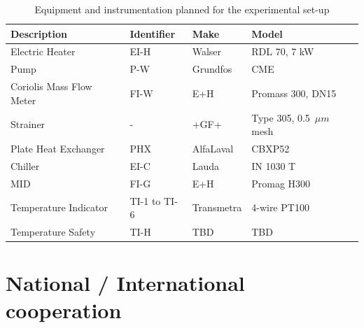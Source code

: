 \documentclass[english]{SFOEYearlyReportEnglish_2018}
\begin{document}
\begin{table}
\centering
\caption{Equipment and instrumentation planned for the experimental set-up}
\setlength\extrarowheight{5pt}
\begin{tabular}{|m{4cm}|m{2cm}|m{2cm}|m{4cm}|}
\hline
\textbf{Description}     & \textbf{Identifier}                      & \textbf{Make}                         & \textbf{Model}                         \\ \hline
Electric Heater          & EI-H                                     & Walser                                & RDL 70, 7 kW                           \\ \hline
Pump                     & P-W                                      & Grundfos                              & CME                                    \\ \hline
Coriolis Mass Flow Meter & FI-W                                     & E+H                                   & Promass 300, DN15                      \\ \hline
Strainer                 & -                                        & +GF+                                  & Type 305, 0.5~$\mu m$ mesh             \\ \hline
Plate Heat Exchanger     & PHX                                      & AlfaLaval                             & CBXP52                                 \\ \hline
Chiller                  & EI-C                                     & Lauda                                 & IN 1030 T                              \\ \hline
MID                      & FI-G                                     & E+H                                   & Promag H300                            \\ \hline
Temperature Indicator    & TI-1 to TI-6                             & Transmetra                            & 4-wire PT100                           \\ \hline
Temperature Safety       & TI-H                                     & TBD                                   & TBD                                    \\ \hline
\end{tabular}

\label{table:setup_material}
\end{table}





\section{National / International cooperation}
\end{document}
